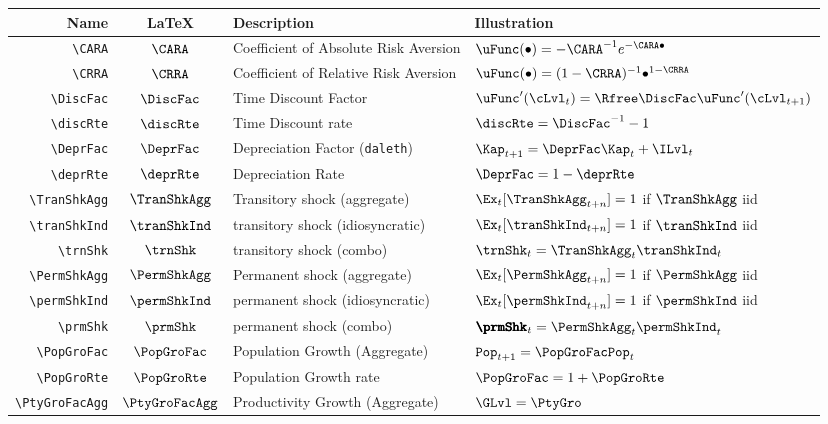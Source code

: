 \documentclass[12pt]{\econtex}
\begin{document}
\hypertarget{Parameters}{}
\begin{table}[ht]
  \centering
  \begin{tabular}{|>{\ttfamily}rcll|} 		
    \hline
    Name    & \LaTeX         & Description & Illustration
    \\ \hline
    \verb|\CARA|        & $\CARA$       & Coefficient of Absolute Risk Aversion &$\uFunc(\bullet)=-\CARA^{-1} e^{-\CARA \bullet}$
    \\ \verb|\CRRA|        & $\CRRA$       & Coefficient of Relative Risk Aversion & $\uFunc(\bullet)=(1-\CRRA)^{-1}\bullet^{1-\CRRA}$ 
    \\ \verb|\DiscFac|     & $\DiscFac$    & Time Discount Factor & $\uFunc^{\prime}(\cLvl_{t}) =  \Rfree \DiscFac \uFunc^{\prime}(\cLvl_{t+1})$
    \\ \verb|\discRte|     & $\discRte$    & Time Discount rate & $\discRte=\DiscFac^{-1}-1$
    \\ \verb|\DeprFac|     & $\DeprFac$    & Depreciation Factor (\texttt{daleth}) & $\Kap_{t+1} = \DeprFac \Kap_{t}+\ILvl_{t}$
    \\ \verb|\deprRte|     & $\deprRte$    & Depreciation Rate & $\DeprFac = 1-\deprRte$
    \\ \verb|\TranShkAgg|  & $\TranShkAgg$ & Transitory shock (aggregate) & $\Ex_{t}[\TranShkAgg_{t+n}]=1$ if $\TranShkAgg$ iid
    \\ \verb|\tranShkInd|  & $\tranShkInd$ & transitory shock (idiosyncratic) &  $\Ex_{t}[\tranShkInd_{t+n}]=1$ if $\tranShkInd$ iid
    \\ \verb|\trnShk|      & $\trnShk$ & transitory shock (combo) &  $\trnShk_{t} = \TranShkAgg_{t}\tranShkInd_{t}$
    \\ \verb|\PermShkAgg|  & $\PermShkAgg$ & Permanent shock (aggregate) & $\Ex_{t}[\PermShkAgg_{t+n}]=1$ if $\PermShkAgg$ iid
    \\ \verb|\permShkInd|  & $\permShkInd$ & permanent shock (idiosyncratic) & $\Ex_{t}[\permShkInd_{t+n}]=1$ if $\permShkInd$ iid
    \\ \verb|\prmShk|      & $\prmShk$ & permanent shock (combo) & $\pmb{\prmShk}_{t} = \PermShkAgg_{t} \permShkInd_{t}$
    \\ \verb|\PopGroFac|   & $\PopGroFac$ & Population Growth (Aggregate) & $\mathtt{Pop}_{t+1} = \PopGroFac \mathtt{Pop}_{t}$
    \\ \verb|\PopGroRte|   & $\PopGroRte$ & Population Growth rate & $\PopGroFac = 1 + \PopGroRte$
    \\ \verb|\PtyGroFacAgg|  & $\PtyGroFacAgg$ & Productivity Growth (Aggregate) & $\GLvl = \PtyGro$

\end{tabular}
\end{table}
\end{document}
